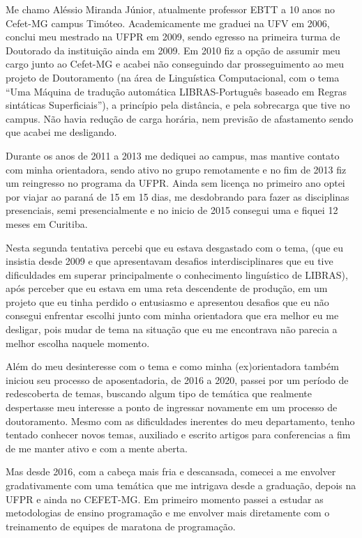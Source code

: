 Me chamo Aléssio Miranda Júnior, atualmente professor EBTT a 10 anos no Cefet-MG campus Timóteo. Academicamente me graduei na UFV em 2006, conclui meu mestrado na UFPR em 2009, sendo egresso na primeira turma de Doutorado da instituição ainda em 2009. Em 2010 fiz a opção de assumir meu cargo junto ao Cefet-MG e acabei não conseguindo dar prosseguimento ao meu projeto de Doutoramento (na área de Linguística Computacional, com o tema “Uma Máquina de tradução automática LIBRAS-Português baseado em Regras sintáticas Superficiais”), a princípio pela distância, e pela sobrecarga que tive no campus. Não havia redução de carga horária, nem previsão de afastamento sendo que acabei me desligando. 

Durante os anos de 2011 a 2013 me dediquei ao campus, mas mantive contato com minha orientadora, sendo ativo no grupo remotamente e no fim de 2013 fiz um reingresso no programa da UFPR. Ainda sem licença no primeiro ano optei por viajar ao paraná de 15 em 15 dias, me desdobrando para fazer as disciplinas presenciais, semi presencialmente e no inicio de 2015 consegui uma e fiquei 12 meses em Curitiba. 

Nesta segunda tentativa percebi que eu estava desgastado com o tema, (que eu insistia desde 2009 e que apresentavam desafios interdisciplinares que eu tive dificuldades em superar principalmente o conhecimento linguístico de LIBRAS), após perceber que eu estava em uma reta descendente de produção, em um projeto que eu tinha perdido o entusiasmo e apresentou desafios que eu não consegui enfrentar escolhi junto com minha orientadora que era melhor eu me desligar, pois mudar de tema na situação que eu me encontrava não parecia a melhor escolha naquele momento.

Além do meu desinteresse com o tema e como minha (ex)orientadora também iniciou seu processo de aposentadoria, de 2016 a 2020, passei por um período de redescoberta de temas, buscando algum tipo de temática que realmente despertasse meu interesse a ponto de ingressar novamente em um processo de doutoramento. Mesmo com as dificuldades inerentes do meu departamento, tenho tentado conhecer novos temas, auxiliado e escrito artigos para conferencias a fim de me manter ativo e com a mente aberta.

Mas desde 2016, com a cabeça mais fria e descansada, comecei a me envolver gradativamente com uma temática que me intrigava desde a graduação, depois na UFPR e ainda no CEFET-MG. Em primeiro momento passei a estudar as metodologias de ensino programação e me envolver mais diretamente com o treinamento de equipes de maratona de programação. 
	
